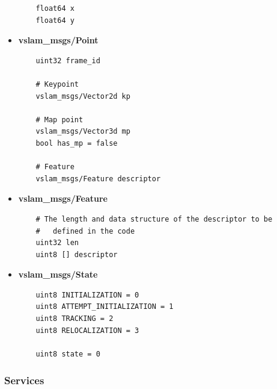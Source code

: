 \begin{itemize}
\begin{verbatim}
    float64 x 
    float64 y 
  \end{verbatim}

  \item \textbf{vslam\_msgs/Point}
  \begin{verbatim}
    uint32 frame_id
    
    # Keypoint
    vslam_msgs/Vector2d kp

    # Map point
    vslam_msgs/Vector3d mp
    bool has_mp = false
    
    # Feature
    vslam_msgs/Feature descriptor    
  \end{verbatim}

  \item \textbf{vslam\_msgs/Feature}
  \begin{verbatim}
    # The length and data structure of the descriptor to be 
    #   defined in the code
    uint32 len
    uint8 [] descriptor
  \end{verbatim}

  \item \textbf{vslam\_msgs/State}
  \begin{verbatim}
    uint8 INITIALIZATION = 0
    uint8 ATTEMPT_INITIALIZATION = 1
    uint8 TRACKING = 2
    uint8 RELOCALIZATION = 3
    
    uint8 state = 0
  \end{verbatim}
\end{itemize}

\subsubsection{Services}

